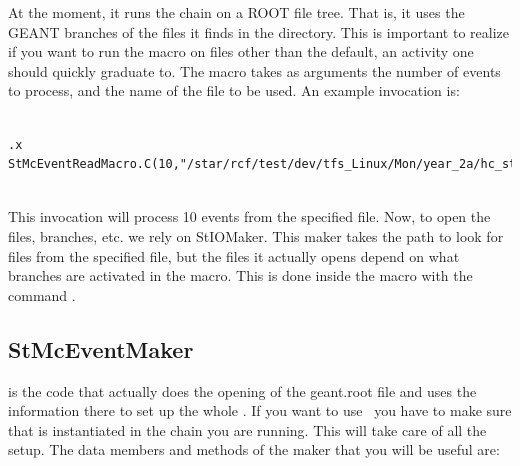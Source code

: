 At the moment, it runs the chain on a ROOT file tree.  That is, it uses
the GEANT branches of the files it finds in the directory.  This is important to
realize if you want to run the macro on files other than the default, an
activity one should quickly graduate to.  The macro takes as arguments the
number of events to process, and the name of the file to be used.  An example invocation
is:

{\footnotesize

\begin{verbatim}

.x StMcEventReadMacro.C(10,"/star/rcf/test/dev/tfs_Linux/Mon/year_2a/hc_standard/*.geant.root")
     

\end{verbatim}
}
This invocation will process 10 events from the specified file.
Now, to open the files, branches, etc. we rely on StIOMaker.  This maker
takes the path to look for files from the specified file, but the files
it actually
opens depend on
what branches are activated in the macro.
This is done inside the macro with the command .

\subsection{StMcEventMaker}
 is the code that actually does the opening of
the geant.root file and uses the information there to set up the
whole \StMcEvent .  If you want to use \StMcEvent\ you have to make
sure that  is instantiated in the chain you
are running.  This will take care of all the setup.  The data
members and methods of the maker that you will be useful are:

